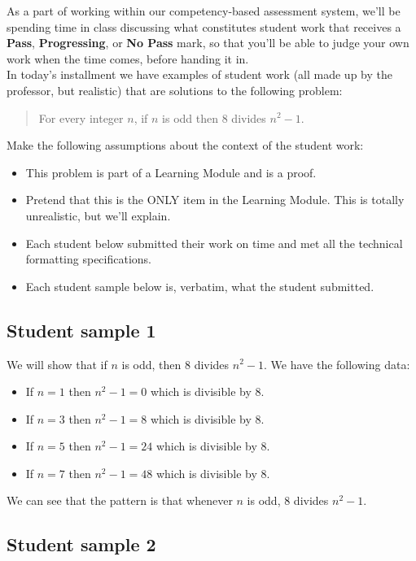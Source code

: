 \documentclass[11pt,letterpaper]{article}
\begin{document}
As a part of working within our competency-based assessment system, we'll be spending time in class discussing what constitutes student work that receives a \textbf{Pass}, \textbf{Progressing}, or \textbf{No Pass} mark, so that you'll be able to judge your own work when the time comes, before handing it in. \\

In today's installment we have examples of student work (all made up by the professor, but realistic) that are solutions to the following problem: 
\begin{quote}
	For every integer $n$, if $n$ is odd then $8$ divides $n^2 - 1$. 
\end{quote}
Make the following assumptions about the context of the student work: 
\begin{itemize}
	\item This problem is part of a Learning Module and is a proof. 
	\item Pretend that this is the ONLY item in the Learning Module. This is totally unrealistic, but we'll explain. 
	\item Each student below submitted their work on time and met all the technical formatting specifications. 
	\item Each student sample below is, verbatim, what the student submitted. 
\end{itemize}


\subsection*{Student sample 1} %
\label{sub:student_sample_1}

We will show that if $n$ is odd, then $8$ divides $n^2 - 1$. We have the following data: 
\begin{itemize}
	\item If $n = 1$ then $n^2 - 1= 0$ which is divisible by $8$. 
	\item If $n = 3$ then $n^2 - 1 = 8$ which is divisible by $8$. 
	\item If $n = 5$ then $n^2 - 1 = 24$ which is divisible by $8$.
	\item If $n = 7$ then $n^2 - 1 = 48$ which is divisible by $8$. 
\end{itemize}
We can see that the pattern is that whenever $n$ is odd, $8$ divides $n^2-1$. 




\subsection*{Student sample 2} %
\label{sub:student_sample_2}
\end{document}
